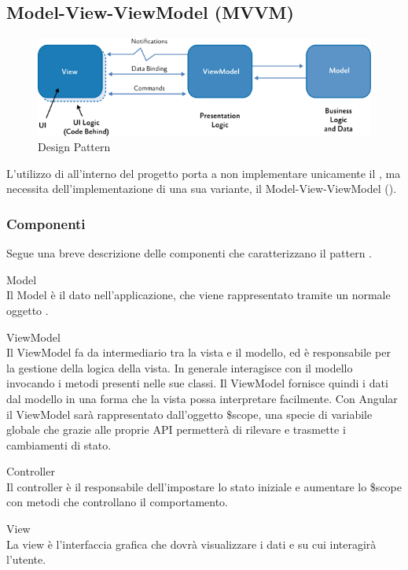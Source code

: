\documentclass[a4paper, titlepage]{article}
\begin{document}
\subsection{Model-View-ViewModel (MVVM)}
\begin{figure}[htp]
\centering
\includegraphics[scale=0.50]{Img/MVVM.png}
\caption{Design Pattern }
\label{} 
\end{figure}
L'utilizzo di  all'interno del progetto porta a non implementare unicamente il  , ma 
necessita dell'implementazione di una sua variante, il Model-View-ViewModel ().

\subsubsection{Componenti}
Segue una breve descrizione delle componenti che caratterizzano il pattern .

\begin{description}
\item{Model} 
\\ Il Model è il dato nell’applicazione, che viene rappresentato tramite un normale oggetto .
\item{ViewModel}
\\ Il ViewModel fa da intermediario tra la vista e il modello, ed è responsabile per la gestione della logica della vista. In generale interagisce con il modello invocando i metodi presenti nelle sue classi.
Il ViewModel fornisce quindi i dati dal modello in una forma che la vista possa interpretare facilmente.
\newline Con Angular il ViewModel sarà rappresentato dall’oggetto \$scope, una specie di variabile globale  che grazie alle proprie API permetterà di rilevare e trasmette i cambiamenti di stato.
\item{Controller}
\\ Il controller è il responsabile dell’impostare lo stato iniziale e aumentare lo \$scope con metodi che controllano il comportamento.
\item{View}
\\ La view è l’interfaccia grafica che dovrà visualizzare i dati e su cui interagirà l'utente.
\end{description}
\end{document}
